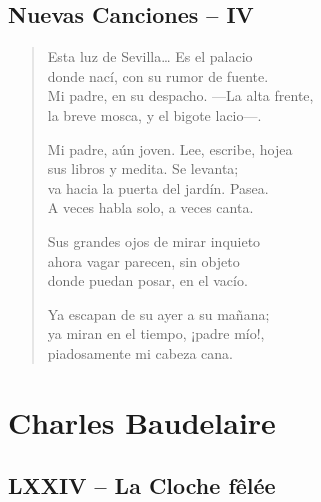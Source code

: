 \documentclass[10pt,a5paper,oneside]{book}
\begin{document}
\chapter{Nuevas Canciones -- IV}

\begin{verse}
Esta luz de Sevilla\ldots{} Es el palacio\\
donde nací, con su rumor de fuente.\\
Mi padre, en su despacho. ---La alta frente,\\
la breve mosca, y el bigote lacio---.

Mi padre, aún joven. Lee, escribe, hojea\\
sus libros y medita. Se levanta;\\
va hacia la puerta del jardín. Pasea.\\
A veces habla solo, a veces canta.

Sus grandes ojos de mirar inquieto\\
ahora vagar parecen, sin objeto\\
donde puedan posar, en el vacío.

Ya escapan de su ayer a su mañana;\\
ya miran en el tiempo, ¡padre mío!,\\
piadosamente mi cabeza cana.
\end{verse}

\part{Charles Baudelaire}

\chapter{LXXIV -- La Cloche fêlée}
\end{document}
